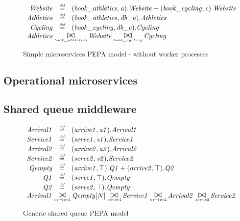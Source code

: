 \begin{figure}
	\caption{Simple microservices PEPA model - without worker processes}
	\centering
\begin{displaymath}
\begin{array}{rcl}
		\mathit{Website} & \rmdef & (\mathit{book\_athletics},\mathit{a}).\mathit{Website}+(\mathit{book\_cycling},\mathit{c}).\mathit{Website}\\
\mathit{Athletics} & \rmdef & (\mathit{book\_athletics},\mathit{db\_a}).\mathit{Athletics}\\
\mathit{Cycling} & \rmdef & (\mathit{book\_cycling},\mathit{db\_c}).\mathit{Cycling}\\
[0.0ex]		\multicolumn{3}{l}{\mathit{Athletics}\sync{book\_athletics}\mathit{Website}\sync{book\_cycling}\mathit{Cycling}}\\
[0.0ex]	\end{array}
\end{displaymath}
\end{figure}

%
%
\subsection{Operational microservices}



%
%
\subsection{Shared queue middleware}

\begin{figure}
	\caption{Generic shared queue PEPA model}
	\centering
	\begin{displaymath}
	\begin{array}{rcl}
	\mathit{Arrival1} & \rmdef & (\mathit{arrive1},\mathit{a1}).\mathit{Arrival1}\\
	\mathit{Service1} & \rmdef & (\mathit{serve1},\mathit{s1}).\mathit{Service1}\\
	\mathit{Arrival2} & \rmdef & (\mathit{arrive2},\mathit{a2}).\mathit{Arrival2}\\
	\mathit{Service2} & \rmdef & (\mathit{serve2},\mathit{s2}).\mathit{Service2}\\
	\mathit{Qempty} & \rmdef & (\mathit{arrive1},\top).\mathit{Q1}+(\mathit{arrive2},\top).\mathit{Q2}\\
	\mathit{Q1} & \rmdef & (\mathit{serve1},\top).\mathit{Qempty}\\
	\mathit{Q2} & \rmdef & (\mathit{serve2},\top).\mathit{Qempty}\\
	[0.0ex]		\multicolumn{3}{l}{\mathit{Arrival1}\sync{arrive1}\mathit{Qempty}[N]\sync{serve1}\mathit{Service1}\sync{arrive2}\mathit{Arrival2}\sync{serve2}\mathit{Service2}}\\
	[0.0ex]	\end{array}
	\end{displaymath}
\end{figure}

